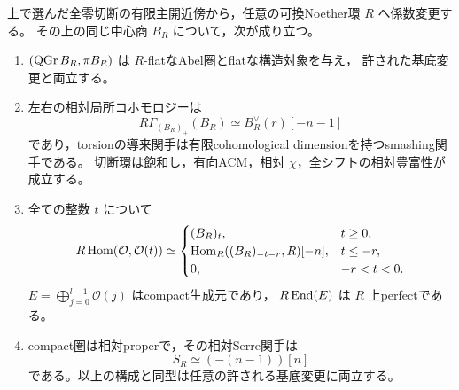 \begin{theorem}\label{thm:simultaneous-relative-tails}
上で選んだ全零切断の有限主開近傍から，任意の可換Noether環 $R$ へ係数変更する。
その上の同じ中心商 $B_R$ について，次が成り立つ。
\begin{enumerate}
 \item $(\operatorname{QGr} B_R,\pi B_R)$ は $R$-flatなAbel圏とflatな構造対象を与え，
       許された基底変更と両立する。
 \item 左右の相対局所コホモロジーは
       \[
        R\Gamma_{(B_R)_+}(B_R)\simeq B_R^\vee(r)[-n-1]
       \]
       であり，torsionの導来関手は有限cohomological dimensionを持つsmashing関手である。
       切断環は飽和し，有向ACM，相対 $\chi$，全シフトの相対豊富性が成立する。
 \item 全ての整数 $t$ について
       \[
        R\operatorname{Hom}(\mathcal O,\mathcal O(t))\simeq
        \begin{cases}
         (B_R)_t,&t\ge0,\\
         \operatorname{Hom}_R((B_R)_{-t-r},R)[-n],&t\le-r,\\
         0,&-r<t<0.
        \end{cases}
       \]
       $E=\bigoplus_{j=0}^{l-1}\mathcal O(j)$ はcompact生成元であり，
       $R\operatorname{End}(E)$ は $R$ 上perfectである。
 \item compact圏は相対properで，その相対Serre関手は
       \[
          S_R\simeq(-(n-1))[n]
       \]
       である。以上の構成と同型は任意の許される基底変更に両立する。
\end{enumerate}
\end{theorem}
